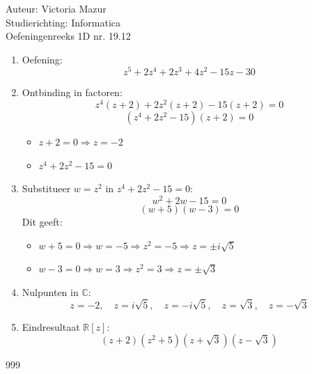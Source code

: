 \documentclass[a4paper,fleqn]{article}
\begin{document}
  
\noindent \large Auteur: Victoria Mazur \\
\noindent \large Studierichting: Informatica\\
\noindent \large Oefeningenreeks 1D nr. 19.12\\

\medskip

\normalsize

\begin{enumerate}
    \item Oefening:
    $$
    z^5 + 2z^4 + 2z^3 + 4z^2 - 15z - 30
    $$

    \item Ontbinding in factoren:
    $$
    z^4(z + 2) + 2z^2(z + 2) - 15(z + 2) = 0
    $$
    $$
    (z^4 + 2z^2 - 15)(z + 2) = 0
    $$
    \begin{itemize}
        \item \( z + 2 = 0 \Rightarrow z = -2 \)
        \item \( z^4 + 2z^2 - 15 = 0 \)
    \end{itemize}

    \item Substitueer \( w = z^2 \) in \( z^4 + 2z^2 - 15 = 0 \):
    $$
    w^2 + 2w - 15 = 0
    $$
    $$
    (w + 5)(w - 3) = 0
    $$
    Dit geeft:
    \begin{itemize}
        \item \( w + 5 = 0 \Rightarrow w = -5 \Rightarrow z^2 = -5 \Rightarrow z = \pm i\sqrt{5} \)
        \item \( w - 3 = 0 \Rightarrow w = 3 \Rightarrow z^2 = 3 \Rightarrow z = \pm \sqrt{3} \)
    \end{itemize}

    \item Nulpunten in \(\mathbb{C}\):
    $$
    z = -2, \quad z = i\sqrt{5}, \quad z = -i\sqrt{5}, \quad z = \sqrt{3}, \quad z = -\sqrt{3}
    $$

    \item Eindresultaat \(\mathbb{R}[z]\):
    $$
    (z + 2)(z^2 + 5)(z + \sqrt{3})(z - \sqrt{3})
    $$
\end{enumerate}

\begin{thebibliography}{999}
\end{thebibliography}
\end{document}
